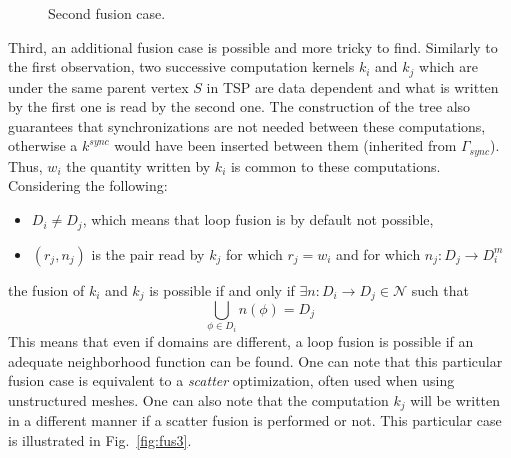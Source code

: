 \begin{figure}[h!]
\begin{center}
\caption{Second fusion case.}
\label{fig:fus2}
\end{center}
\end{figure}

Third, an additional fusion case is possible and more tricky to find. Similarly to the first observation, two successive computation kernels $k_i$ and $k_j$ which are under the same parent vertex $S$ in TSP are data dependent and what is written by the first one is read by the second one. The construction of the tree also guarantees that synchronizations are not needed between these computations, otherwise a $k^{sync}$ would have been inserted between them (inherited from $\Gamma_{sync}$). Thus, $w_i$ the quantity written by $k_i$ is common to these computations. Considering the following:
\begin{itemize}
\item $D_i \neq D_j$, which means that loop fusion is by default not possible,
\item $(r_j,n_j)$ is the pair read by $k_j$ for which $r_j=w_i$ and for which $n_j:D_j \rightarrow D_i^m$
\end{itemize}
the fusion of $k_i$ and $k_j$ is possible if and only if $\exists n:D_i \rightarrow D_j \in \mathcal{N}$ such that
\begin{equation*}
\bigcup_{\phi \in D_i} n(\phi) = D_j
\end{equation*}
This means that even if domains are different, a loop fusion is possible if an adequate neighborhood function can be found. One can note that this particular fusion case is equivalent to a \emph{scatter} optimization, often used when using unstructured meshes. One can also note that the computation $k_j$ will be written in a different manner if a scatter fusion is performed or not. This particular case is illustrated in Fig.~\ref{fig:fus3}.

